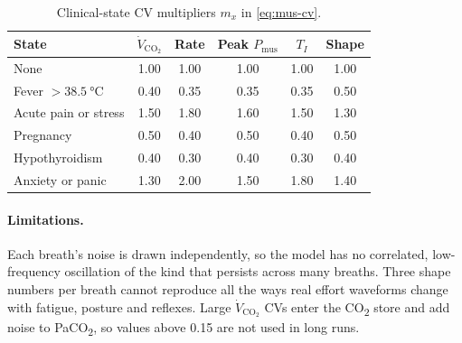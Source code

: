 \begin{table}[htbp]\centering\small
\caption{Clinical-state CV multipliers $m_x$ in \cref{eq:mus-cv}.}
\label{tab:mus-cvmod}
\begin{tabular}{@{}lccccc@{}}\toprule
State & $\dot V_{\mathrm{CO_2}}$ & Rate & Peak $P_{\mathrm{mus}}$ & $T_I$ & Shape\\\midrule
None & 1.00 & 1.00 & 1.00 & 1.00 & 1.00\\
Fever $>\SI{38.5}{\celsius}$ & 0.40 & 0.35 & 0.35 & 0.35 & 0.50\\
Acute pain or stress & 1.50 & 1.80 & 1.60 & 1.50 & 1.30\\
Pregnancy & 0.50 & 0.40 & 0.50 & 0.40 & 0.50\\
Hypothyroidism & 0.40 & 0.30 & 0.40 & 0.30 & 0.40\\
Anxiety or panic & 1.30 & 2.00 & 1.50 & 1.80 & 1.40\\\bottomrule
\end{tabular}
\end{table}

\paragraph{Limitations.} Each breath's noise is drawn independently, so the model has no correlated, low-frequency oscillation of the kind that persists across many breaths. Three shape numbers per breath cannot reproduce all the ways real effort waveforms change with fatigue, posture and reflexes. Large $\dot V_{\mathrm{CO_2}}$ CVs enter the CO\textsubscript{2} store and add noise to PaCO\textsubscript{2}, so values above 0.15 are not used in long runs.

